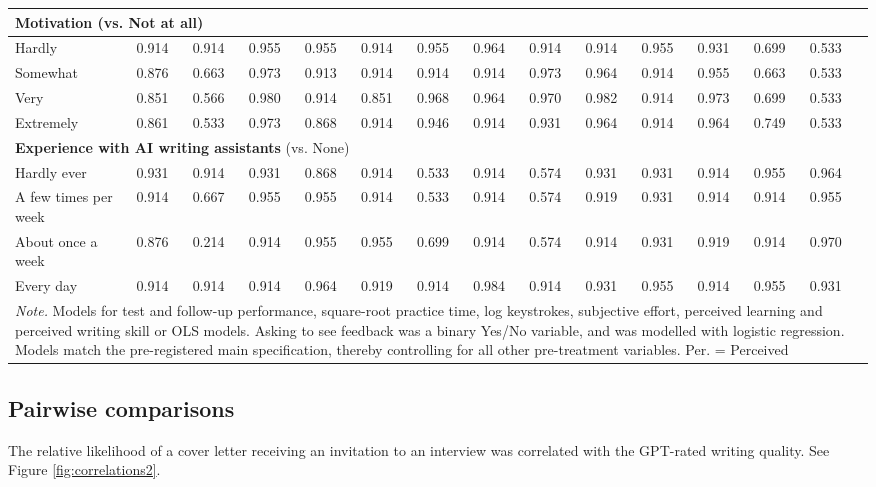\documentclass[11pt]{report}
\begin{document}
\begin{append}
\begin{landscape}
\begin{table}[h]
\begin{tabular}{@{\extracolsep{-4pt}}lcccccccccccccc}
    \multicolumn{14}{l}{\textbf{Motivation} (vs. Not at all)} \\ 
    \midrule
    Hardly          & 0.914 & 0.914 & 0.955 & 0.955 & 0.914 & 0.955 & 0.964 & 0.914 & 0.914 & 0.955 & 0.931 & 0.699 & 0.533 \\ 
    Somewhat        & 0.876 & 0.663 & 0.973 & 0.913 & 0.914 & 0.914 & 0.914 & 0.973 & 0.964 & 0.914 & 0.955 & 0.663 & 0.533 \\ 
    Very            & 0.851 & 0.566 & 0.980 & 0.914 & 0.851 & 0.968 & 0.964 & 0.970 & 0.982 & 0.914 & 0.973 & 0.699 & 0.533 \\ 
    Extremely       & 0.861 & 0.533 & 0.973 & 0.868 & 0.914 & 0.946 & 0.914 & 0.931 & 0.964 & 0.914 & 0.964 & 0.749 & 0.533 \\ \midrule
    \multicolumn{14}{l}{\textbf{Experience with AI writing assistants} (vs. None)} \\ 
\midrule
Hardly ever & 0.931 & 0.914 & 0.931 & 0.868 & 0.914 & 0.533 & 0.914 & 0.574 & 0.931 & 0.931 & 0.914 & 0.955 & 0.964 \\ 
A few times per week     & 0.914 & 0.667 & 0.955 & 0.955 & 0.914 & 0.533 & 0.914 & 0.574 & 0.919 & 0.931 & 0.914 & 0.914 & 0.955 \\ 
About once a week        & 0.876 & 0.214 & 0.914 & 0.955 & 0.955 & 0.699 & 0.914 & 0.574 & 0.914 & 0.931 & 0.919 & 0.914 & 0.970 \\ 
Every day                & 0.914 & 0.914 & 0.914 & 0.964 & 0.919 & 0.914 & 0.984 & 0.914 & 0.931 & 0.955 & 0.914 & 0.955 & 0.931 \\ 
\midrule
\multicolumn{14}{p{\textwidth}}{\textit{Note.} Models for test and follow-up performance, square-root practice time, log keystrokes, subjective effort, perceived learning and perceived writing skill or OLS models. Asking to see feedback was a binary Yes/No variable, and was modelled with logistic regression. Models match the pre-registered main specification, thereby controlling for all other pre-treatment variables. Per. = Perceived}
\vspace{5pt}
    \end{tabular}
\end{table}
\end{landscape}

\subsection{Pairwise comparisons}
The relative likelihood of a cover letter receiving an invitation to an interview was correlated with the GPT-rated writing quality. See Figure \ref{fig:correlations2}.


\end{append}
\end{document}
